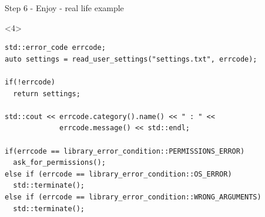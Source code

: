 \documentclass[10pt]{beamer}
\begin{document}
\begin{frame}[fragile]{Step 6 - Enjoy - real life example}
	\begin{onlyenv}
	\begin{verbatim}
std::error_code errcode;
auto settings = read_user_settings("settings.txt", errcode);

if(!errcode)
  return settings;

std::cout << errcode.category().name() << " : " <<
             errcode.message() << std::endl;

if(errcode == library_error_condition::PERMISSIONS_ERROR)
  ask_for_permissions();
else if (errcode == library_error_condition::OS_ERROR)
  std::terminate();
else if (errcode == library_error_condition::WRONG_ARGUMENTS)
  std::terminate();
	\end{verbatim}
	\end{onlyenv}

\end{frame}
\end{document}
